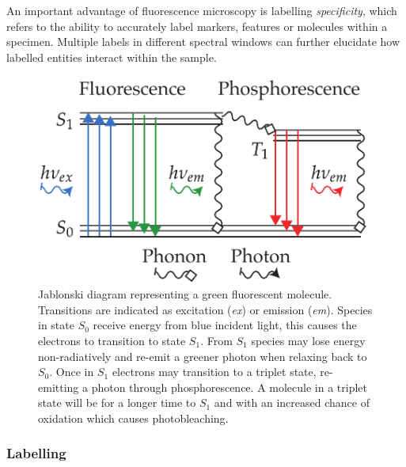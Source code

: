 An important advantage of fluorescence microscopy is labelling \emph{\gls{specificity}}, which refers to the ability to accurately label markers, features or molecules within a specimen.
Multiple labels in different spectral windows can further elucidate how labelled entities interact within the sample.

\begin{figure}
    \centering
    \includegraphics{jablonski_triplet_newer}
    \caption[Standard jablonski diagram]{
    Jablonski diagram representing a green fluorescent molecule.
    Transitions are indicated as excitation (\emph{ex}) or emission (\emph{em}). %
    Species in state $S_0$ receive energy from blue incident light,
    this causes the electrons to transition to state $S_1$.
    From $S_1$ species may lose energy non-radiatively and re-emit a greener photon when relaxing back to $S_0$.
    Once in $S_1$ electrons may transition to a triplet state, re-emitting a photon through phosphorescence.
    A molecule in a triplet state will be for a longer time to $S_1$ and with an increased chance of oxidation which causes photobleaching.%
        }
    \label{fig:jablonski_triplet_new}
\end{figure}


\subsubsection{Labelling}

